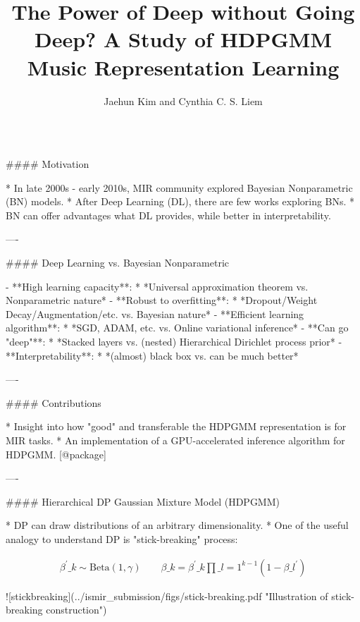 \documentclass{beamer}
\author[j.h.kim@tudelft.nl]{Jaehun Kim and Cynthia C. S. Liem}
\title{The Power of Deep without Going Deep? A Study of HDPGMM Music Representation Learning}
\institute{Delft University of Technology}
\begin{document}
\begin{frame}[fragile]\centering



\begin{columns}[T]

\begin{column}{.46\textwidth}

\begin{markdown}


#### Motivation

* In late 2000s - early 2010s, MIR community explored Bayesian Nonparametric (BN) models.
* After Deep Learning (DL), there are few works exploring BNs.
* BN can offer advantages what DL provides, while better in interpretability.

----

#### Deep Learning vs. Bayesian Nonparametric

- **High learning capacity**:
    * *Universal approximation theorem vs. Nonparametric nature*
- **Robust to overfitting**:
    * *Dropout/Weight Decay/Augmentation/etc. vs. Bayesian nature*
- **Efficient learning algorithm**:
    * *SGD, ADAM, etc. vs. Online variational inference*
- **Can go "deep"**:
    * *Stacked layers vs. (nested) Hierarchical Dirichlet process prior*
- **Interpretability**:
    * *(almost) black box vs. can be much better*

----

#### Contributions

* Insight into how "good" and transferable the HDPGMM representation is for MIR tasks.
* An implementation of a GPU-accelerated inference algorithm for HDPGMM. [@package]

----

\bigskip
{\hrulefill}
\bigskip

#### Hierarchical DP Gaussian Mixture Model (HDPGMM)

* DP can draw distributions of an arbitrary dimensionality.
* One of the useful analogy to understand DP is "stick-breaking" process:

\begin{align}
    \beta^{\prime}\_{k} \sim \text{Beta}(1, \gamma) \qquad
    \beta\_{k} = \beta^{\prime}\_{k} \prod\_{l=1}^{k-1} (1 - \beta\_{l}^{\prime})
\end{align}


![stickbreaking](../ismir_submission/figs/stick-breaking.pdf "Illustration of stick-breaking construction")


\end{markdown}
\end{column}
\end{columns}
\end{frame}
\end{document}
